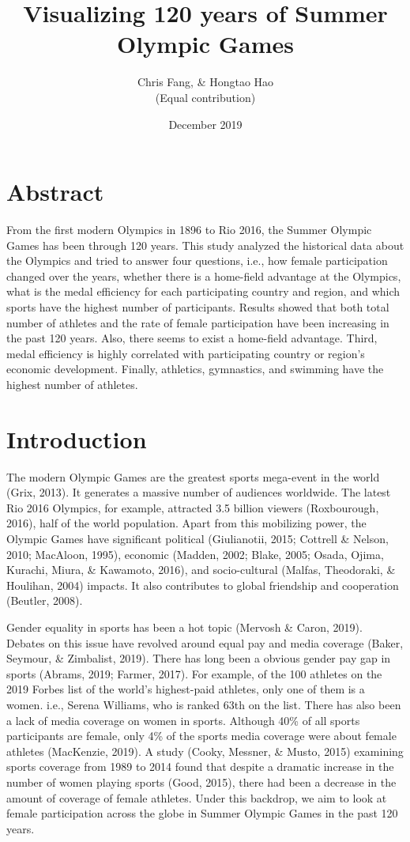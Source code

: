 \documentclass[12pt]{article}
\title{Visualizing 120 years of Summer Olympic Games}
\author{Chris Fang, \& Hongtao Hao \\ (Equal contribution)}
\date{December 2019}
\begin{document}
\section*{Abstract}
From the first modern Olympics in 1896 to Rio 2016, the Summer Olympic Games has been through 120 years. This study analyzed the historical data about the Olympics and tried to answer four questions, i.e., how female participation changed over the years, whether there is a home-field advantage at the Olympics, what is the medal efficiency for each participating country and region, and which sports have the highest number of participants. Results showed that both total number of athletes and the rate of female participation have been increasing in the past 120 years. Also, there seems to exist a home-field advantage. Third, medal efficiency is highly correlated with participating country or region's economic development. Finally, athletics, gymnastics, and swimming have the highest number of athletes.
\newpage
\tableofcontents
\maketitle

\maketitle

\section{Introduction}
\flushleft
The modern Olympic Games are the greatest sports mega-event in the world (Grix, 2013). It generates a massive number of  audiences worldwide. The latest Rio 2016 Olympics, for example, attracted 3.5 billion viewers (Roxbourough, 2016), half of the world population. Apart from this mobilizing power, the Olympic Games have significant political (Giulianotii, 2015; Cottrell \& Nelson, 2010; MacAloon, 1995), economic (Madden, 2002; Blake, 2005; Osada, Ojima, Kurachi, Miura, \& Kawamoto, 2016), and socio-cultural (Malfas, Theodoraki, \& Houlihan, 2004) impacts. It also contributes to global friendship and cooperation (Beutler, 2008). 

Gender equality in sports has been a hot topic (Mervosh \& Caron, 2019). Debates on this issue have revolved around equal pay and media coverage (Baker, Seymour, \& Zimbalist, 2019). There has long been a obvious gender pay gap in sports (Abrams, 2019; Farmer, 2017). For example, of the 100 athletes on the 2019 Forbes list of the world’s highest-paid athletes, only one of them is a women. i.e., Serena Williams, who is ranked 63th on the list. There has also been a lack of media coverage on women in sports. Although 40\% of all sports participants are female, only 4\% of the sports media coverage were about female athletes (MacKenzie, 2019). A study (Cooky, Messner, \& Musto, 2015) examining sports coverage from 1989 to 2014 found that despite a dramatic increase in the number of women playing sports (Good, 2015), there had been a decrease in the amount of coverage of female athletes. Under this backdrop, we aim to look at female participation across the globe in Summer Olympic Games in the past 120 years.
\end{document}
